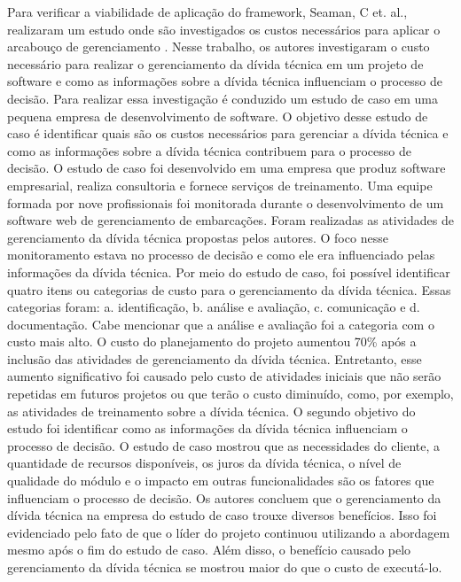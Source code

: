Para verificar a viabilidade de aplicação do framework, Seaman, C et. al., realizaram um estudo onde são investigados os custos necessários para aplicar o arcabouço de gerenciamento
 \cite{guo2016exploring}. Nesse trabalho, os autores investigaram o custo necessário para realizar o gerenciamento da dívida técnica em um projeto de software e como as informações sobre a dívida técnica influenciam o processo de decisão. Para realizar essa investigação é conduzido um estudo de caso em uma pequena empresa de desenvolvimento de software. O objetivo desse estudo de caso é identificar quais são os custos necessários para gerenciar a dívida técnica e como as informações sobre a dívida técnica contribuem para o processo de decisão.  O estudo de caso foi desenvolvido em uma empresa que produz software empresarial, realiza consultoria e fornece serviços de treinamento. Uma equipe formada por nove profissionais foi monitorada durante o desenvolvimento de um software web de gerenciamento de embarcações. Foram realizadas as atividades de gerenciamento da dívida técnica propostas pelos autores. O foco nesse monitoramento estava no processo de decisão e como ele era influenciado pelas informações da dívida técnica. Por meio do estudo de caso, foi possível identificar quatro itens ou categorias de custo para o gerenciamento da dívida técnica. Essas categorias foram: a. identificação, b. análise e avaliação, c. comunicação e d. documentação. Cabe mencionar que a análise e avaliação foi a categoria com o custo mais alto. O custo do planejamento do projeto aumentou 70\% após a inclusão das atividades de gerenciamento da dívida técnica. Entretanto, esse aumento significativo foi causado pelo custo de atividades iniciais que não serão repetidas em futuros projetos ou que terão o custo diminuído, como, por exemplo, as atividades de treinamento sobre a dívida técnica. O segundo objetivo do estudo foi identificar como as informações da dívida técnica influenciam o processo de decisão. O estudo de caso mostrou que as necessidades do cliente, a quantidade de recursos disponíveis, os juros da dívida técnica, o nível de qualidade do módulo e o impacto em outras funcionalidades são os fatores que influenciam o processo de decisão. Os autores concluem que o gerenciamento da dívida técnica na empresa do estudo de caso trouxe diversos benefícios. Isso foi evidenciado pelo fato de que o líder do projeto continuou utilizando a abordagem mesmo após o fim do estudo de caso. Além disso, o benefício causado pelo gerenciamento da dívida técnica se mostrou maior do que o custo de executá-lo. 


